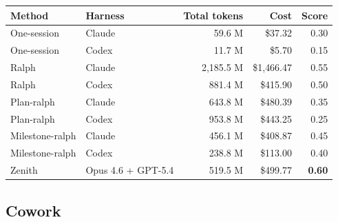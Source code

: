 \documentclass[11pt,a4paper]{article}
\newcommand{\code}[1]{#1}
\begin{document}
\noindent\begin{tabular}{@{}llrrr@{}}
\toprule
\rowcolor{tablehead}\textbf{\color{white}Method} & \textbf{\color{white}Harness} & \textbf{\color{white}Total tokens} & \textbf{\color{white}Cost} & \textbf{\color{white}Score} \\
\midrule
\code{One-session}    & Claude              & 59.6 M    & \$37.32      & 0.30 \\
\rowcolor{tableband}
\code{One-session}    & Codex               & 11.7 M    & \$5.70       & 0.15 \\
\code{Ralph}          & Claude              & 2{,}185.5 M & \$1{,}466.47 & 0.55 \\
\rowcolor{tableband}
\code{Ralph}          & Codex               & 881.4 M   & \$415.90     & 0.50 \\
\code{Plan-ralph}     & Claude              & 643.8 M   & \$480.39     & 0.35 \\
\rowcolor{tableband}
\code{Plan-ralph}     & Codex               & 953.8 M   & \$443.25     & 0.25 \\
\code{Milestone-ralph}& Claude              & 456.1 M   & \$408.87     & 0.45 \\
\rowcolor{tableband}
\code{Milestone-ralph}& Codex               & 238.8 M   & \$113.00     & 0.40 \\
\code{Zenith}         & Opus 4.6 + GPT-5.4  & 519.5 M   & \$499.77     & \textbf{0.60} \\
\bottomrule
\end{tabular}

\subsection*{Cowork}
\end{document}
